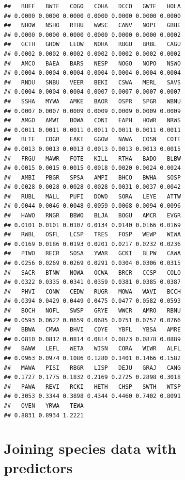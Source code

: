 \documentclass[12pt,]{scrbook}
\begin{document}
\begin{verbatim}
##   BUFF   BWTE   COGO   COHA   DCCO   GWTE   HOLA 
## 0.0000 0.0000 0.0000 0.0000 0.0000 0.0000 0.0000 
##   NHOW   NSHO   RTHU   WWSC   CANV   NOPI   GBHE 
## 0.0000 0.0000 0.0000 0.0000 0.0000 0.0000 0.0002 
##   GCTH   GHOW   LEOW   NOHA   RBGU   BRBL   CAGU 
## 0.0002 0.0002 0.0002 0.0002 0.0002 0.0002 0.0002 
##   AMCO   BAEA   BARS   NESP   NOGO   NOPO   NSWO 
## 0.0004 0.0004 0.0004 0.0004 0.0004 0.0004 0.0004 
##   RNDU   SNBU   VEER   BEKI   CSWA   MERL   SAVS 
## 0.0004 0.0004 0.0004 0.0007 0.0007 0.0007 0.0007 
##   SSHA   MYWA   AMKE   BAOR   OSPR   SPGR   WBNU 
## 0.0007 0.0007 0.0009 0.0009 0.0009 0.0009 0.0009 
##   AMGO   AMWI   BOWA   CONI   EAPH   HOWR   NRWS 
## 0.0011 0.0011 0.0011 0.0011 0.0011 0.0011 0.0011 
##   BLTE   COGR   EAKI   GGOW   NAWA   COSN   COTE 
## 0.0013 0.0013 0.0013 0.0013 0.0013 0.0013 0.0015 
##   FRGU   MAWR   FOTE   KILL   RTHA   BADO   BLBW 
## 0.0015 0.0015 0.0015 0.0018 0.0020 0.0024 0.0024 
##   AMBI   PBGR   SPSA   AMPI   BHCO   BWHA   SOSP 
## 0.0028 0.0028 0.0028 0.0028 0.0031 0.0037 0.0042 
##   RUBL   MALL   PUFI   DOWO   SORA   LEYE   ATTW 
## 0.0044 0.0046 0.0048 0.0059 0.0068 0.0094 0.0096 
##   HAWO   RNGR   BBWO   BLJA   BOGU   AMCR   EVGR 
## 0.0101 0.0101 0.0107 0.0134 0.0140 0.0166 0.0169 
##   RWBL   OSFL   LCSP   TRES   FOSP   WEWP   WIWA 
## 0.0169 0.0186 0.0193 0.0201 0.0217 0.0232 0.0236 
##   PIWO   RECR   SOSA   YWAR   GCKI   BLPW   CAWA 
## 0.0256 0.0269 0.0269 0.0291 0.0304 0.0306 0.0315 
##   SACR   BTNW   NOWA   OCWA   BRCR   CCSP   COLO 
## 0.0322 0.0335 0.0341 0.0359 0.0381 0.0385 0.0387 
##   PHVI   CONW   CEDW   RUGR   MOWA   WAVI   BCCH 
## 0.0394 0.0429 0.0449 0.0475 0.0477 0.0582 0.0593 
##   BOCH   NOFL   SWSP   GRYE   WWCR   AMRO   RBNU 
## 0.0593 0.0622 0.0659 0.0685 0.0751 0.0757 0.0766 
##   BBWA   CMWA   BHVI   COYE   YBFL   YBSA   AMRE 
## 0.0810 0.0812 0.0814 0.0814 0.0873 0.0878 0.0889 
##   BAWW   LEFL   WETA   WISN   CORA   WIWR   ALFL 
## 0.0963 0.0974 0.1086 0.1280 0.1401 0.1466 0.1582 
##   MAWA   PISI   RBGR   LISP   DEJU   GRAJ   CANG 
## 0.1727 0.1775 0.1832 0.2169 0.2725 0.2898 0.3018 
##   PAWA   REVI   RCKI   HETH   CHSP   SWTH   WTSP 
## 0.3053 0.3344 0.3898 0.4344 0.4460 0.7402 0.8091 
##   OVEN   YRWA   TEWA 
## 0.8831 0.8934 1.2221
\end{verbatim}

\hypertarget{joining-species-data-with-predictors}{%
\section{Joining species data with predictors}\label{joining-species-data-with-predictors}}
\end{document}
